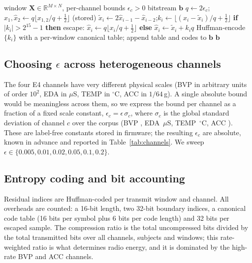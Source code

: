 \documentclass[conference]{IEEEtran}
\begin{document}
\begin{algorithm}[t]
\caption{On-device compression of one transmit window}
\label{alg:pipe}
\begin{algorithmic}[1]
\REQUIRE window $\mathbf{X}\in\mathbb{R}^{M\times N}$, per-channel bounds $\epsilon_c>0$
\ENSURE bitstream $\mathbf{b}$
  \STATE $q\leftarrow 2\epsilon_c$; \quad $\hat{x}_1,\hat{x}_2 \leftarrow q\lfloor x_{1,2}/q+\tfrac12\rfloor$ (stored)
    \STATE $\tilde{x}_i\leftarrow 2\hat{x}_{i-1}-\hat{x}_{i-2}$;\quad $k_i\leftarrow\lfloor (x_i-\tilde{x}_i)/q+\tfrac12\rfloor$
    \STATE \textbf{if} $|k_i|>2^{15}-1$ \textbf{then} escape: $\hat{x}_i\leftarrow q\lfloor x_i/q+\tfrac12\rfloor$ \textbf{else} $\hat{x}_i\leftarrow\tilde{x}_i+k_iq$
  \ENDFOR
  \STATE Huffman-encode $\{k_i\}$ with a per-window canonical table; append table and codes to $\mathbf{b}$
\ENDFOR
\RETURN $\mathbf{b}$
\end{algorithmic}
\end{algorithm}

\subsection{Choosing $\epsilon$ across heterogeneous channels}
The four E4 channels have very different physical scales (BVP in arbitrary units of order $10^2$, EDA in $\mu$S, TEMP in $^\circ$C, ACC in $1/64$\,g). A single absolute bound would be meaningless across them, so we express the bound per channel as a fraction of a fixed scale constant, $\epsilon_c=\epsilon\,\sigma_c$, where $\sigma_c$ is the global standard deviation of channel $c$ over the corpus (BVP \sigmaBVP, EDA \sigmaEDA\,$\mu$S, TEMP \sigmaTEMP\,$^\circ$C, ACC \sigmaACC). These are label-free constants stored in firmware; the resulting $\epsilon_c$ are absolute, known in advance and reported in Table~\ref{tab:channels}. We sweep $\epsilon\in\{0.005,0.01,0.02,0.05,0.1,0.2\}$.

\subsection{Entropy coding and bit accounting}
Residual indices are Huffman-coded per transmit window and channel. All overheads are counted: a 16-bit length, two 32-bit boundary indices, a canonical code table (16 bits per symbol plus 6 bits per code length) and 32 bits per escaped sample. The compression ratio is the total uncompressed bits divided by the total transmitted bits over all channels, subjects and windows; this rate-weighted ratio is what determines radio energy, and it is dominated by the high-rate BVP and ACC channels.
\end{document}
